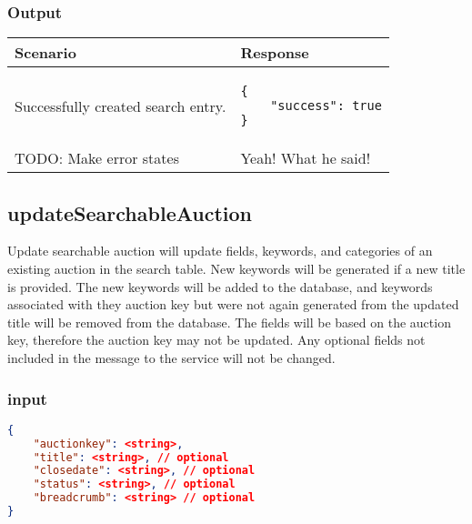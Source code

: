\documentclass[12pt,a4paper]{article}
\begin{document}
\subsubsection{Output}
\begin{center}
    \begin{tabular}{| p{5cm} | l |}
        \hline
        \textbf{Scenario} & \textbf{Response} \\
        \hline
        Successfully created search entry. & 
        \begin{lstlisting}[boxpos=t,language=tableJson,firstnumber=1]
{
    "success": true
}
        \end{lstlisting} \\ 
        \hline
            TODO: Make error states & Yeah! What he said! \\
        \hline
    \end{tabular}
\end{center}

\subsection{updateSearchableAuction}
Update searchable auction will update fields, keywords, and categories of an
existing auction in the search table. New keywords will be generated if a new
title is provided. The new keywords will be added to the database, and keywords
associated with they auction key but were not again generated from the updated
title will be removed from the database. The fields will be based on the
auction key, therefore the auction key may not be updated. Any optional fields
not included in the message to the service will not be changed.

\subsubsection{input}
\begin{lstlisting}[language=json,firstnumber=1]
{
    "auctionkey": <string>,
    "title": <string>, // optional
    "closedate": <string>, // optional
    "status": <string>, // optional
    "breadcrumb": <string> // optional
}
\end{lstlisting}
\end{document}
